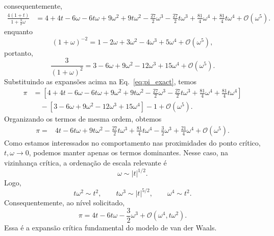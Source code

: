 \documentclass[11pt,a4paper]{article}
\begin{document}
%
consequentemente,
%
\begin{align}
    \frac{4(1+t)}{1+\frac32\omega}
    &=
    4+4t
    -6\omega
    -6t\omega
    +9\omega^2
    +9t\omega^2
    -\frac{27}{2}\omega^3
    -\frac{27}{2}t\omega^3
    +\frac{81}{4}\omega^4
    +\frac{81}{4}t\omega^4
    +\mathcal{O}(\omega^5).
\end{align}
%
enquanto
%
\begin{equation}
    (1+\omega)^{-2}
    =
    1-2\omega+3\omega^2
    -4\omega^3+5\omega^4
    +\mathcal O(\omega^5),
\end{equation}
%
portanto, 
%
\begin{equation}
    \frac{3}{(1+\omega)^2}
    =
    3-6\omega+9\omega^2-12\omega^3
    +15\omega^4
    +\mathcal{O}(\omega^5).
\end{equation}
%
Substituindo as expansões acima na Eq.~\ref{eq:pi_exact}, temos
%
\begin{align}
    \pi
    &=
    \left[
    4+4t
    -6\omega
    -6t\omega
    +9\omega^2
    +9t\omega^2
    -\frac{27}{2}\omega^3
    -\frac{27}{2}t\omega^3
    +\frac{81}{4}\omega^4
    +\frac{81}{4}t\omega^4
    \right]
    \nonumber\\
    &\quad
    -
    \left[
    3-6\omega+9\omega^2
    -12\omega^3+15\omega^4
    \right]
    -1
    +\mathcal{O}(\omega^5).
\end{align}
%
Organizando os termos de mesma ordem, obtemos
%
\begin{equation}
    \begin{aligned}
        \pi
        ={}&
        4t
        -6t\omega
        +9t\omega^2
        -\frac{27}{2}t\omega^3
        +\frac{81}{4}t\omega^4
        -\frac{3}{2}\omega^3
        +\frac{21}{4}\omega^4
        +\mathcal{O}(\omega^5).
    \end{aligned}
    \label{eq:pi_expanded}
\end{equation}
%
Como estamos interessados no comportamento nas proximidades do ponto
crítico, $t,\omega\rightarrow0$, podemos manter apenas os termos
dominantes. Nesse caso, na vizinhança crítica, a ordenação de escala relevante é
%
\begin{equation}
    \omega\sim |t|^{1/2}.
\end{equation}
%
Logo,
%
\begin{equation}
    t\omega^2\sim t^2,
\qquad
    t\omega^3\sim |t|^{5/2},
\qquad
    \omega^4\sim t^2.
\end{equation}
%
Consequentemente, ao nível solicitado,
%
\begin{equation}
    \boxed{
    \pi
    =
    4t
    -6t\omega
    -\frac32\omega^3
    +
    \mathcal{O}(\omega^4,t\omega^2).
    }
    \label{eq:critical_expansion}
\end{equation}
%
Essa é a expansão crítica fundamental do modelo de van der Waals.
\end{document}
